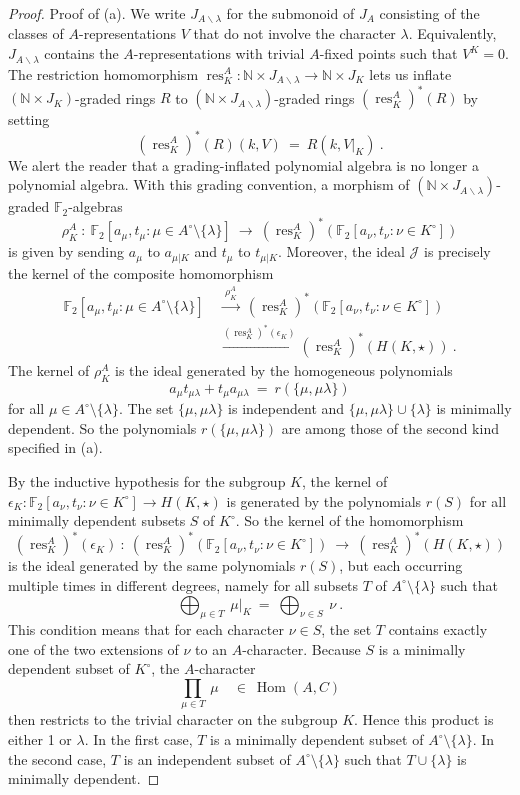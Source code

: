 \documentclass[10pt,a4paper]{amsart}
\DeclareMathOperator{\Hom}{Hom}
\DeclareMathOperator{\res}{res}
\newcommand{\Jc}{{\mathcal J}}
\newcommand{\mF}{{\mathbb F}}
\newcommand{\mN}{{\mathbb N}}
\newcommand{\xra}{\xrightarrow}
\renewcommand{\to}{\longrightarrow}
\begin{document}
\begin{proof}
  Proof of (a). We write $J_{A\backslash\lambda}$ for the submonoid of $J_A$ consisting of
  the classes of $A$-representations $V$ that do not involve the character $\lambda$.
  Equivalently, $J_{A\backslash\lambda}$ contains the $A$-representations
  with trivial $A$-fixed points such that $V^K=0$.
  The restriction homomorphism $\res^A_K:\mN\times J_{A\backslash\lambda}\to\mN\times J_K$
  lets us inflate $(\mN\times J_K)$-graded rings $R$
  to $(\mN\times J_{A\backslash\lambda})$-graded rings $(\res^A_K)^*(R)$ by setting
  \[ (\res^A_K)^*(R)(k,V)\ = \ R(k,V|_K)\ . \]
  We alert the reader that a grading-inflated polynomial algebra
  is no longer a polynomial algebra.
  With this grading convention, a morphism
  of $(\mN\times J_{A\backslash\lambda})$-graded $\mF_2$-algebras
  \[  \rho^A_K\ : \   \mF_2[a_\mu,t_\mu\colon  \mu\in A^\circ\setminus\{\lambda\}] \ \to \
  (\res^A_K)^*\left(  \mF_2[a_\nu,t_\nu\colon  \nu\in K^\circ]  \right) \]
  is given by sending $a_\mu$ to $a_{\mu|K}$ and $t_\mu$ to $t_{\mu|K}$. 
  Moreover, the ideal $\Jc$ is precisely the kernel of the composite homomorphism
  \begin{align*}
    \mF_2[a_\mu,t_\mu\colon  \mu\in A^\circ\setminus\{\lambda\}] \
    &\xra{\ \rho^A_K\ } \
      (\res^A_K)^*\left(  \mF_2[a_\nu,t_\nu\colon  \nu\in K^\circ]  \right)\\
    &\xra{(\res^A_K)^*(\epsilon_K)} (\res^A_K)^* (  H(K,\star) ) \ .
  \end{align*}
  The kernel of $\rho^A_K$ is the ideal generated by the homogeneous polynomials
  \[
    a_\mu t_{\mu\lambda} + t_\mu a_{\mu\lambda}\ = \ r(\{\mu,\mu\lambda\})
  \]
  for all $\mu\in A^\circ\setminus\{\lambda\}$.
  The set $\{\mu,\mu\lambda\}$ is independent
  and $\{\mu,\mu\lambda\}\cup\{\lambda\}$ is minimally dependent.
  So the polynomials $r(\{\mu,\mu\lambda\})$ are among those of the second kind specified in (a).

  By the inductive hypothesis for the subgroup $K$,
  the kernel of $\epsilon_K: \mF_2[a_\nu,t_\nu\colon  \nu\in K^\circ] \to H(K,\star)$
  is generated by the polynomials $r(S)$ for all minimally dependent subsets $S$
  of $K^\circ$. So the kernel of the homomorphism
  \[  (\res^A_K)^*(\epsilon_K)\ : \ 
    (\res^A_K)^*\left(  \mF_2[a_\nu,t_\nu\colon  \nu\in K^\circ]  \right)
    \ \to \  (\res^A_K)^* (  H(K,\star) ) \]
  is the ideal generated by the same polynomials $r(S)$, but each occurring
  multiple times in different degrees, namely for all subsets $T$ of
  $A^\circ\setminus\{\lambda\}$ such that 
  \[ {\bigoplus}_{\mu\in T}\ \mu|_K \ = \ {\bigoplus}_{\nu\in S}\ \nu\ . \]
  This condition means that for each character $\nu\in S$, the set $T$
  contains exactly one of the two extensions of $\nu$ to an $A$-character.
  Because $S$ is a minimally dependent subset of $K^\circ$, the $A$-character
  \[ {\prod}_{\mu\in T}\ \mu \quad \in \ \Hom(A,C)\]
  then restricts to the trivial character on the subgroup $K$.
  Hence this product is either 1 or $\lambda$.
  In the first case, $T$ is a minimally dependent subset of $A^\circ\setminus\{\lambda\}$.
  In the second case, $T$ is an independent subset of $A^\circ\setminus\{\lambda\}$
  such that $T\cup\{\lambda\}$ is minimally dependent.


\end{proof}
\end{document}
